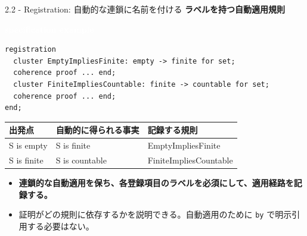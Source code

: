 \documentclass[dvipdfmx,aspectratio=169,11pt]{beamer}
\newcommand{\statusbadge}[2]{\colorbox{#1}{\textcolor{white}{\strut\scriptsize\sffamily\bfseries #2}}}
\newcommand{\badgeSpec}{\statusbadge{green!35!black}{specification example}}
\begin{document}
\begin{frame}[fragile,t]{2.2 - Registration: 自動的な連鎖に名前を付ける}
\smallskip
\textbf{ラベルを持つ自動適用規則}~\badgeSpec
\begin{lstlisting}[language={mizar},basicstyle=\ttfamily\small]
registration
  cluster EmptyImpliesFinite: empty -> finite for set;
  coherence proof ... end;
  cluster FiniteImpliesCountable: finite -> countable for set;
  coherence proof ... end;
end;
\end{lstlisting}
\begin{footnotesize}
\setlength{\tabcolsep}{3pt}
\renewcommand{\arraystretch}{1.15}
\begin{tabularx}{\textwidth}{>{\raggedright\arraybackslash}X>{\raggedright\arraybackslash}X>{\raggedright\arraybackslash}X}
\toprule
\textbf{出発点} & \textbf{自動的に得られる事実} & \textbf{記録する規則} \\
\midrule
S is empty & S is finite & EmptyImpliesFinite \\
S is finite & S is countable & FiniteImpliesCountable \\
\bottomrule
\end{tabularx}
\end{footnotesize}

\begin{itemize}
\setlength{\itemsep}{1pt}
\setlength{\parsep}{0pt}
\setlength{\parskip}{0pt}
\item \textcolor{blue!55!black}{\textbf{連鎖的な自動適用を保ち、各登録項目のラベルを必須にして、適用経路を記録する。}}
\item 証明がどの規則に依存するかを説明できる。自動適用のために \texttt{by} で明示引用する必要はない。
\end{itemize}
\end{frame}
\end{document}
